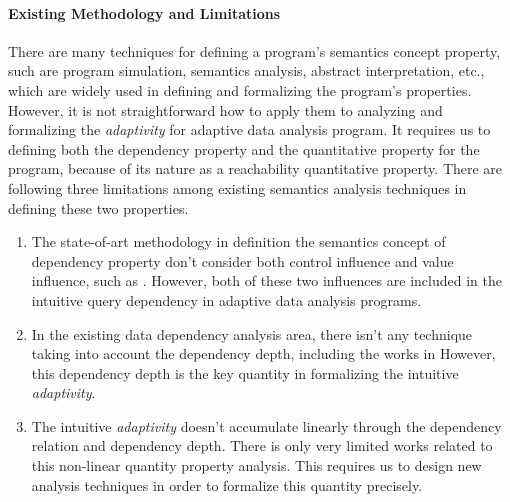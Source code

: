 \paragraph{Existing Methodology and Limitations}
There are many techniques for defining a program's semantics concept property, such are program simulation, 
semantics analysis, abstract interpretation, etc., which are widely used in defining
and formalizing the program's properties.
However, it is not straightforward how to apply them to analyzing and formalizing the \emph{adaptivity}
for adaptive data analysis program.
It requires us to defining both the dependency property and the quantitative property for the program,
because of its nature as a reachability quantitative property.
There are following three limitations among existing semantics analysis techniques in defining these two properties.
\begin{enumerate}
\item
The state-of-art methodology in definition the semantics concept of dependency property don't
consider both control influence and value influence, such as \cite{Cousot19a, DenningD77, AbadiBHR99, Mantel2004, CheneyAA11}.
However, both of these
two influences are included in the intuitive query dependency 
in adaptive data analysis programs.

\item In the existing data dependency analysis area, there isn't any technique taking into account
the dependency depth, including the works in \cite{GoguenM84, AssafNSTT17, BartheDR11}
However, this dependency depth is the key quantity in formalizing the intuitive \emph{adaptivity}.
\item The intuitive \emph{adaptivity} doesn't accumulate linearly through the dependency relation and 
dependency depth. There is only very limited works related to this non-linear quantity property analysis.
This requires us to design new analysis techniques in order to formalize this quantity precisely.
\end{enumerate}
%
